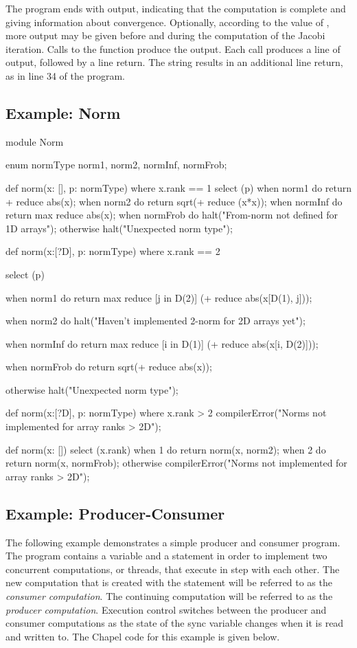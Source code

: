 The program ends with output, indicating that the computation is complete
and giving information about convergence.  Optionally, according to the
value of , more output may be given before and during the
computation of the Jacobi iteration.  Calls to the function 
produce the output.  Each  call
produces a line of output, followed by a line return.  The string 
results in  an additional line return, as in line 34 of the program.

\subsection{Example: Norm}

\begin{numberedchapel}
module Norm{
  enum normType {norm1, norm2, normInf, normFrob};

  def norm(x: [], p: normType) where x.rank == 1 {
    select (p) {
      when norm1 do return + reduce abs(x);
      when norm2 do return sqrt(+ reduce (x*x));
      when normInf do return max reduce abs(x);
      when normFrob do halt("From-norm not defined for 1D arrays");
      otherwise halt("Unexpected norm type");
    }
  }

  def norm(x:[?D], p: normType) where x.rank == 2 {
    select (p) {
      when norm1 do
        return max reduce [j in D(2)] (+ reduce abs(x[D(1), j]));

      when norm2 do
        halt("Haven't implemented 2-norm for 2D arrays yet");

      when normInf do
        return max reduce [i in D(1)] (+ reduce abs(x[i, D(2)]));

      when normFrob do return sqrt(+ reduce abs(x));

      otherwise halt("Unexpected norm type");
    }
  }

  def norm(x:[?D], p: normType) where x.rank > 2 {
    compilerError("Norms not implemented for array ranks > 2D");
  }

  def norm(x: []) {
    select (x.rank) {
      when 1 do return norm(x, norm2);
      when 2 do return norm(x, normFrob);
      otherwise compilerError("Norms not implemented for array ranks > 2D");
    }
  }
}
\end{numberedchapel}

\subsection{Example: Producer-Consumer}
The following example demonstrates a simple producer and consumer program.
The program contains a  variable and a  statement 
in order to implement two concurrent computations, or threads, that execute 
in step with each other.
The new computation that is created with the  statement will 
be referred to as the {\em consumer computation}.  The continuing computation
will be referred to as the
{\em producer computation}.  Execution control switches between the
producer and consumer computations as the state of the sync variable  
changes when it is read and written to.  The Chapel code for this example is given below.

